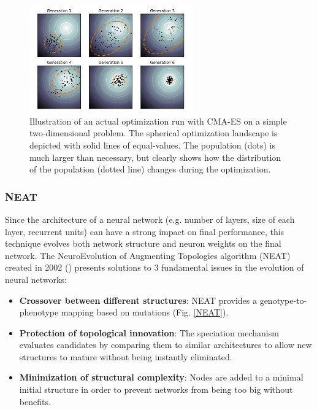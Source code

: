 \begin{figure}[H]
 \centering
 \captionsetup{justification=centering, margin=0.5cm}
 \includegraphics[width=7cm]{images/CMA_ES.png}
 \caption{\label{CMA-ES}Illustration of an actual optimization run with CMA-ES on a simple two-dimensional problem. The spherical optimization landscape is depicted with solid lines of equal-values. The population (dots) is much larger than necessary, but clearly shows how the distribution of the population (dotted line) changes during the optimization. \href{https://en.wikipedia.org/wiki/CMA-ES#/media/File:Concept_of_directional_optimization_in_CMA-ES_algorithm.png}{\color{blue}{Source}}}
 \label{CMA-ES}
\end{figure}

\bigbreak

\subsubsection{NEAT}
Since the architecture of a neural network (e.g. number of layers, size of each layer, recurrent units) can have a strong impact on final performance, this technique evolves both network structure and neuron weights on the final network. The NeuroEvolution of Augmenting Topologies algorithm (NEAT) created in 2002 (\cite{NEAT_1, NEAT_2}) presents solutions to 3 fundamental issues in the evolution of neural networks:

\begin{itemize}
    \item \textbf{Crossover between different structures}: NEAT provides a genotype-to-phenotype mapping based on mutations (Fig. \ref{NEAT}).
    \item \textbf{Protection of topological innovation}: The speciation mechanism evaluates candidates by comparing them to similar architectures to allow new structures to mature without being instantly eliminated. 
    \item \textbf{Minimization of structural complexity}: Nodes are added to a minimal initial structure in order to prevent networks from being too big without benefits.
\end{itemize}
\bigbreak

